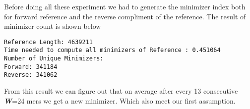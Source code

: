 \documentclass{standalone}
\begin{document}
Before doing all these experiment we had to generate the minimizer index both for forward reference and the reverse compliment of the reference. The result of minimizer count is shown below
\begin{verbatim}
Reference Length: 4639211
Time needed to compute all minimizers of Reference : 0.451064
Number of Unique Minimizers:
Forward: 341184
Reverse: 341062
\end{verbatim}
From this result we can figure out that on average after every 13 consecutive {\bf \emph{W}}=24 mers we get a new minimizer. Which also meet our first assumption.
\end{document}
